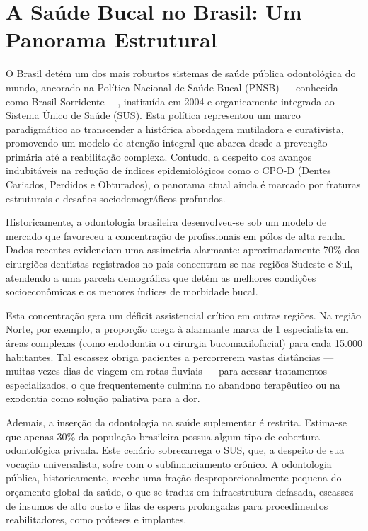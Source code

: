 \section{A Saúde Bucal no Brasil: Um Panorama Estrutural}

O Brasil detém um dos mais robustos sistemas de saúde pública odontológica do mundo, ancorado na Política Nacional de Saúde Bucal (PNSB) — conhecida como Brasil Sorridente —, instituída em 2004 e organicamente integrada ao Sistema Único de Saúde (SUS). Esta política representou um marco paradigmático ao transcender a histórica abordagem mutiladora e curativista, promovendo um modelo de atenção integral que abarca desde a prevenção primária até a reabilitação complexa. Contudo, a despeito dos avanços indubitáveis na redução de índices epidemiológicos como o CPO-D (Dentes Cariados, Perdidos e Obturados), o panorama atual ainda é marcado por fraturas estruturais e desafios sociodemográficos profundos.


Historicamente, a odontologia brasileira desenvolveu-se sob um modelo de mercado que favoreceu a concentração de profissionais em pólos de alta renda. Dados recentes evidenciam uma assimetria alarmante: aproximadamente 70\% dos cirurgiões-dentistas registrados no país concentram-se nas regiões Sudeste e Sul, atendendo a uma parcela demográfica que detém as melhores condições socioeconômicas e os menores índices de morbidade bucal. 

Esta concentração gera um déficit assistencial crítico em outras regiões. Na região Norte, por exemplo, a proporção chega à alarmante marca de 1 especialista em áreas complexas (como endodontia ou cirurgia bucomaxilofacial) para cada 15.000 habitantes. Tal escassez obriga pacientes a percorrerem vastas distâncias — muitas vezes dias de viagem em rotas fluviais — para acessar tratamentos especializados, o que frequentemente culmina no abandono terapêutico ou na exodontia como solução paliativa para a dor.

Ademais, a inserção da odontologia na saúde suplementar é restrita. Estima-se que apenas 30\% da população brasileira possua algum tipo de cobertura odontológica privada. Este cenário sobrecarrega o SUS, que, a despeito de sua vocação universalista, sofre com o subfinanciamento crônico. A odontologia pública, historicamente, recebe uma fração desproporcionalmente pequena do orçamento global da saúde, o que se traduz em infraestrutura defasada, escassez de insumos de alto custo e filas de espera prolongadas para procedimentos reabilitadores, como próteses e implantes.

